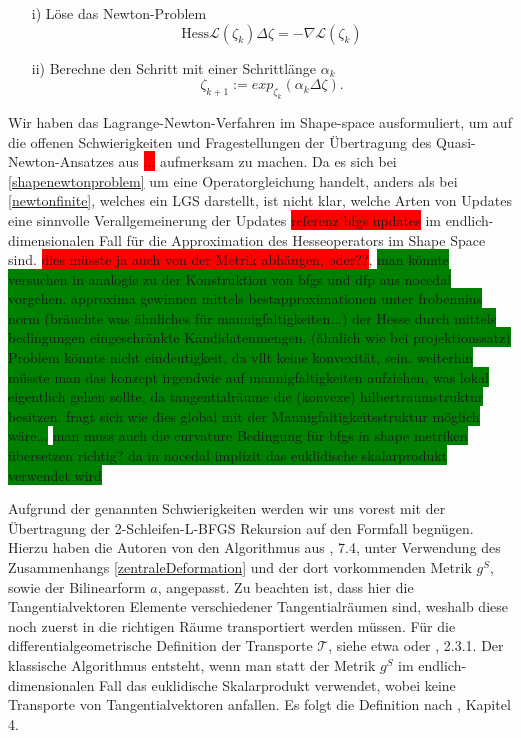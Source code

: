 \documentclass[bibliography=totoc,12pt,a4paper]{scrartcl}
\theoremstyle{exampstyle}
\numberwithin{equation}{section}
\begin{document}
\begin{itemize}
	\item[i)] Löse das Newton-Problem \\
	\begin{equation}\label{shapenewtonproblem}
	\text{Hess}\mathcal{L}(\zeta_k)\Delta \zeta = - \nabla \mathcal{L}(\zeta_k)
	\end{equation}
	\item[ii)] Berechne den Schritt mit einer Schrittlänge $\alpha_k$
	\begin{equation}
	\zeta_{k+1} := exp_{\zeta_k}(\alpha_k \Delta \zeta).
	\end{equation}
\end{itemize}
Wir haben das Lagrange-Newton-Verfahren im Shape-space ausformuliert, um auf die offenen Schwierigkeiten und Fragestellungen der Übertragung des Quasi-Newton-Ansatzes aus \colorbox{red}{...} aufmerksam zu machen. Da es sich bei 
\ref{shapenewtonproblem} um eine Operatorgleichung handelt, anders als bei \ref{newtonfinite}, welches ein LGS darstellt, ist nicht klar, welche Arten von Updates eine sinnvolle Verallgemeinerung der Updates \colorbox{red}{referenz bfgs updates} im endlich-dimensionalen Fall für die Approximation des Hesseoperators im Shape Space sind. \colorbox{red}{dies müsste ja auch von der Metrik abhängen, oder??},
\colorbox{green}{man könnte versuchen in analogie zu der Konstruktion von bfgs und dfp aus nocedal vorgehen. approxima gewinnen mittels bestapproximationen unter frobennius norm (bräuchte was ähnliches für mannigfaltigkeiten...) der Hesse durch mittels bedingungen eingeschränkte Kandidatenmengen. (ähnlich wie bei projektionssatz) Problem könnte nicht eindeutigkeit, da vllt keine konvexität, sein. weiterhin müsste man das konzept irgendwie auf mannigfaltigkeiten aufziehen, was lokal eigentlich gehen sollte, da tangentialräume die (konvexe) hilbertraumstruktur besitzen. fragt sich wie dies global mit der Mannigfaltigkeitsstruktur möglich wäre...}
\colorbox{green}{man muss auch die curvature Bedingung für bfgs in shape metriken übersetzen richtig? da in nocedal implizit das euklidische skalarprodukt verwendet wird}

Aufgrund der genannten Schwierigkeiten werden wir uns vorest mit der Übertragung der 2-Schleifen-L-BFGS Rekursion auf den Formfall begnügen. Hierzu haben die Autoren von \cite{bfgs1} den Algorithmus aus \cite{Nocedal}, 7.4, unter Verwendung des Zusammenhangs \ref{zentraleDeformation} und der dort vorkommenden Metrik $g^S$, sowie der Bilinearform $a$, angepasst. Zu beachten ist, dass hier die Tangentialvektoren Elemente verschiedener Tangentialräumen sind, weshalb diese noch zuerst in die richtigen Räume transportiert werden müssen. Für die differentialgeometrische Definition der Transporte $\mathcal{T}$, siehe etwa \cite{LeeDGEO} oder \cite{shape_space}, 2.3.1. Der klassische Algorithmus entsteht, wenn man statt der Metrik $g^S$ im endlich-dimensionalen Fall das euklidische Skalarprodukt verwendet, wobei keine Transporte von Tangentialvektoren anfallen. Es folgt die Definition nach \cite{bfgs1}, Kapitel 4.
\end{document}
